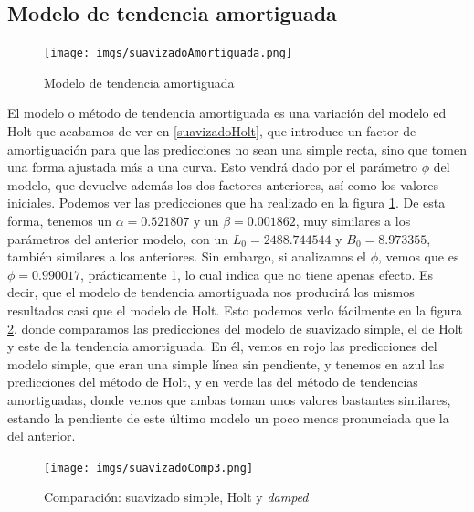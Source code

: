 \documentclass[a4paper,onecolumn]{extarticle}
\begin{document}
\begin{sloppypar}
\subsection{Modelo de tendencia amortiguada} \label{suavizadoAmortiguada}
\begin{center}
    \begin{figure}[h!]
        \centering
        \texttt{[image: imgs/suavizadoAmortiguada.png]}
        \caption{Modelo de tendencia amortiguada} \label{fig:suavizadoAmortiguada}
    \end{figure}
\end{center}
El modelo o método de tendencia amortiguada es una variación del modelo ed Holt que acabamos de ver en \ref{suavizadoHolt}, que introduce un factor de 
amortiguación para que las predicciones no sean una simple recta, sino que tomen una forma ajustada más a una curva. Esto vendrá dado por el parámetro $\phi$ 
del modelo, que devuelve además los dos factores anteriores, así como los valores iniciales. Podemos ver las predicciones que ha realizado en la figura 
\ref{fig:suavizadoAmortiguada}. De esta forma, tenemos un $\alpha=0.521807$ y un $\beta=0.001862$, muy similares a los parámetros del anterior modelo, con un 
$L_{0}=2488.744544$ y $B_{0}=8.973355$, también similares a los anteriores. Sin embargo, si analizamos el $\phi$, vemos que es $\phi=0.990017$, prácticamente
1, lo cual indica que no tiene apenas efecto. Es decir, que el modelo de tendencia amortiguada nos producirá los mismos resultados casi que el modelo de Holt.
Esto podemos verlo fácilmente en la figura \ref{fig:suavizadoComp3}, donde comparamos las predicciones del modelo de suavizado simple, el de Holt y este de la 
tendencia amortiguada. En él, vemos en rojo las predicciones del modelo simple, que eran una simple línea sin pendiente, y tenemos en azul las predicciones 
del método de Holt, y en verde las del método de tendencias amortiguadas, donde vemos que ambas toman unos valores bastantes similares, estando la pendiente 
de este último modelo un poco menos pronunciada que la del anterior.
\begin{center}
    \begin{figure}[h!]
        \centering
        \texttt{[image: imgs/suavizadoComp3.png]}
        \caption{Comparación: suavizado simple, Holt y \textit{damped}} \label{fig:suavizadoComp3}
    \end{figure}
\end{center}


\end{sloppypar}
\end{document}
